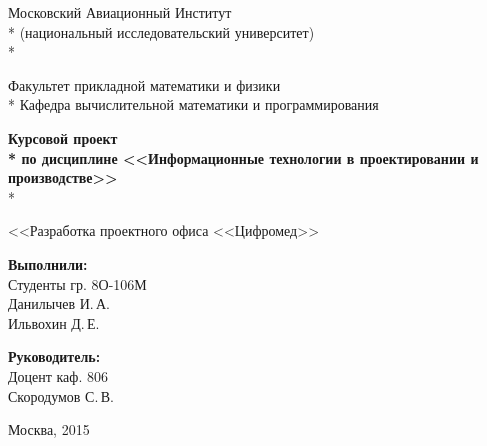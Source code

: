 \begin{titlepage}

\newpage

\begin{center}
Московский Авиационный Институт \\*
(национальный исследовательский университет) \\*

\vspace{2em}

Факультет прикладной математики и физики \\*
Кафедра вычислительной математики и программирования

\vspace{10em}

\Large \textbf{Курсовой проект \\*
по дисциплине <<Информационные технологии в проектировании и производстве>>} \\*

\vspace{3em}

<<Разработка проектного офиса <<Цифромед>>
\end{center}

\vspace{8em}

\begin{minipage}[b]{22em}
  {\bfseries Выполнили:} \\
  \indent Студенты гр. 8О-106М \\
  \indent Данилычев И.\,А. \\
  \indent Ильвохин Д.\,Е.
\end{minipage} \begin{minipage}[b]{10em}
  {\bfseries Руководитель:} \\
  \indent Доцент каф. 806 \\
  \indent Скородумов С.\,В. \\
\end{minipage}
\vspace{\fill}

\begin{center}
Москва, 2015
\end{center}

\end{titlepage}
